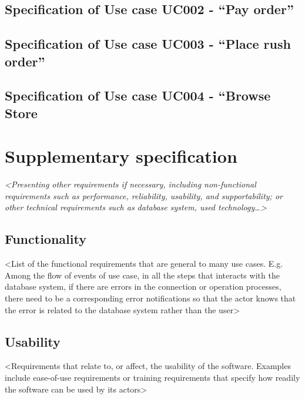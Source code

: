 \documentclass[letterpaper]{report}
\begin{document}
\section[Specification of Use case UC002 {}- “Pay order”]{Specification of Use case UC002 - “Pay order”}


\section[Specification of Use case UC003 {}- “Place rush order”]{Specification of Use case UC003 - “Place rush order”}


\section[Specification of Use case UC004 {}- “Browse Store]{Specification of Use case UC004 - “Browse Store}


\chapter{Supplementary specification}
\textit{{\textless}Presenting other requirements if necessary, including non-functional requirements such as performance, reliability, usability, and supportability; or other technical requirements such as database system, used technology…{\textgreater}}

\section{Functionality}
 {\textless}List of the functional requirements that are general to many use cases. E.g. Among the flow of events of use case, in all the steps that interacts with the database system, if there are errors in the connection or operation processes, there need to be a corresponding error notifications so that the actor knows that the error is related to the database system rather than the user{\textgreater}

\section{Usability}
 {\textless}Requirements that relate to, or affect, the usability of the software. Examples include ease-of-use requirements or training requirements that specify how readily the software can be used by its actors{\textgreater}
\end{document}
